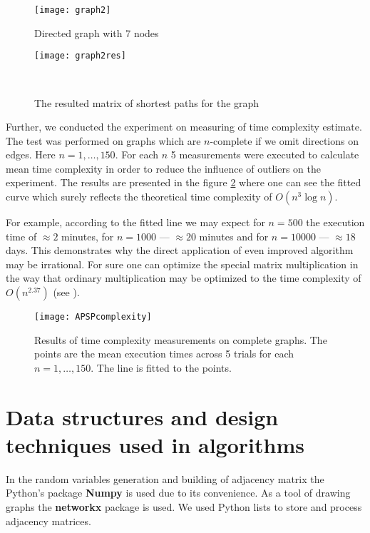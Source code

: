 \documentclass[12pt, bachelor, substylefile = algo_title.rtx]{disser}
\theoremstyle{definition}
\begin{document}
\begin{figure}[!h]
   \begin{minipage}{0.48\textwidth}
     \centering
     \texttt{[image: graph2]}
	\caption{Directed graph with 7 nodes}
	\label{fig: 3}
   \end{minipage}\hfill
   \begin{minipage}{0.48\textwidth}
     \centering
     \texttt{[image: graph2res]}
	\caption{The resulted matrix of shortest paths for the graph}
	\label{fig: 4}
   \end{minipage}\\
\end{figure}

Further, we conducted the experiment on measuring of time complexity estimate. The test was performed on graphs which are $n$-complete if we omit directions on edges. Here $n = 1,\dots,150$. For each $n$ 5 measurements were executed to calculate mean time complexity in order to reduce the influence of outliers on the experiment. The results are presented in the figure \ref{fig: 5} where one can see the fitted curve which surely reflects the theoretical time complexity of $O(n^3\log n)$.

For example, according to the fitted line we may expect for $n = 500$ the execution time of $\approx 2$ minutes, for $n = 1000$ --- $\approx 20 $ minutes and for $n = 10000$ --- $\approx 18$ days. This demonstrates why the direct application of even improved algorithm may be irrational. For sure one can optimize the special matrix multiplication in the way that ordinary multiplication may be optimized to the time complexity of $O(n^{2.37})$ (see \cite{Alman20}).

\begin{figure}[h]
\begin{center}
\texttt{[image: APSPcomplexity]}
\caption{Results of time complexity measurements on complete graphs. The points are the mean execution times across 5 trials for each $n = 1,\dots,150$. The line is fitted to the points.}
\label{fig: 5}
\end{center}
\end{figure}

\section{Data structures and design techniques used in algorithms}
In the random variables generation and building of adjacency matrix the Python's package \textbf{Numpy} is used due to its convenience. As a tool of drawing graphs the \textbf{networkx} package is used. We used Python lists to store and process adjacency matrices.
\end{document}
